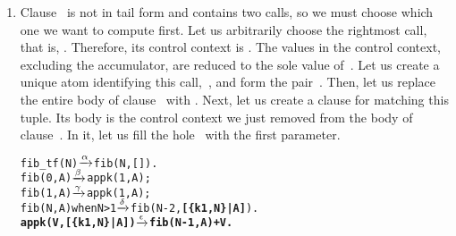 \begin{enumerate}
  \item Clause~\clause{\delta} is not in tail form and contains two
    calls, so we must choose which one we want to compute first. Let
    us arbitrarily choose the rightmost call, that is,
    . Therefore, its control context is
    . The values in the
    control context, excluding the accumulator, are reduced to the
    sole value of~. Let us create a unique atom identifying
    this call,~, and form the
    pair~. Then, let us replace the entire body of
    clause~\clause{\delta} with
    . Next, let us create a
    clause for  matching this tuple. Its body is the
    control context we just removed from the body of
    clause~\clause{\delta}. In it, let us fill the
    hole~\erlcode{\textvisiblespace} with the first parameter.
\begin{alltt}
fib_tf(N)           \(\smashedrightarrow{\alpha}\) fib(N,[]).
fib(0,A)            \(\smashedrightarrow{\beta}\) appk(1,A);
fib(1,A)            \(\smashedrightarrow{\gamma}\) appk(1,A);
fib(N,A) when N > 1 \(\smashedrightarrow{\delta}\) fib(N-2,\textbf{[\{k1,N\}|A]}).
\textbf{appk(V,[\{k1,N\}|A])  \(\smashedrightarrow{\epsilon}\) fib(N-1,A) + V.}
\end{alltt}


\end{enumerate}
